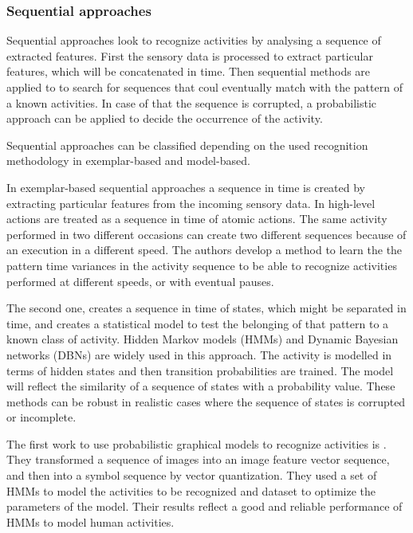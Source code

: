 \documentclass[a4paper, 12pt, openany, oneside]{book}
\begin{document}
\subsubsection{Sequential approaches} %
Sequential approaches look to recognize activities by analysing a sequence of extracted features. First the sensory data is processed to extract particular features, which will be concatenated in time. Then sequential methods are applied to to search for sequences that coul eventually match with the pattern of a known activities. In case of that the sequence is corrupted, a probabilistic approach can be applied to decide the occurrence of the activity.

Sequential approaches can be classified depending on the used recognition methodology in exemplar-based and model-based. 

In exemplar-based sequential approaches a sequence in time is created by extracting particular features from the incoming sensory data. In \citep{Veeraraghavan2006_FuncSpcAct} high-level actions are treated as a sequence in time of atomic actions. The same activity performed in two different occasions can create two different sequences because of an execution in a different speed. The authors develop a method to learn the the pattern time variances in the activity sequence to be able to recognize activities performed at different speeds, or with eventual pauses.

The second one, creates a sequence in time of states, which might be separated in time, and  creates a statistical model to test the belonging of that pattern to a known class of activity. Hidden Markov models (HMMs) and Dynamic Bayesian networks (DBNs) are widely used in this approach. The activity is modelled in terms of hidden states and then transition probabilities are trained. The model will reflect the similarity of a sequence of states with a probability value. These methods can be robust in realistic cases where the sequence of states is corrupted or incomplete.

The first work to use probabilistic graphical models to recognize activities is \citep{Yamato1992_RecHA_HMM}. They transformed a sequence of images into an image feature vector sequence, and then into a symbol sequence by vector quantization. They used a set of HMMs to model the activities to be recognized and dataset to optimize the parameters of the model. Their results reflect a good and reliable performance of HMMs to model human activities. 
\end{document}
